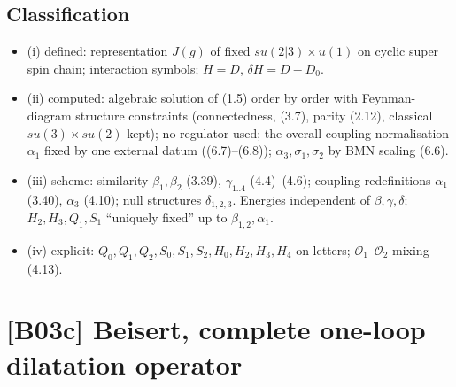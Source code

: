 \documentclass[10pt]{article}
\begin{document}
\subsection{Classification}
\begin{itemize}
\item (i) defined: representation $J(g)$ of fixed $su(2|3)\times u(1)$ on cyclic super spin chain; interaction symbols; $H=D$, $\delta H=D-D_0$.
\item (ii) computed: algebraic solution of (1.5) order by order with Feynman-diagram structure constraints (connectedness, (3.7), parity (2.12), classical $su(3)\times su(2)$ kept); no regulator used; the overall coupling normalisation $\alpha_1$ fixed by one external datum ((6.7)--(6.8)); $\alpha_3,\sigma_1,\sigma_2$ by BMN scaling (6.6).
\item (iii) scheme: similarity $\beta_1,\beta_2$ (3.39), $\gamma_{1..4}$ (4.4)--(4.6); coupling redefinitions $\alpha_1$ (3.40), $\alpha_3$ (4.10); null structures $\delta_{1,2,3}$. Energies independent of $\beta,\gamma,\delta$; $H_2,H_3,Q_1,S_1$ ``uniquely fixed'' up to $\beta_{1,2},\alpha_1$.
\item (iv) explicit: $Q_0,Q_1,Q_2,S_0,S_1,S_2,H_0,H_2,H_3,H_4$ on letters; $\mathcal O_1$--$\mathcal O_2$ mixing (4.13).
\end{itemize}

\section{[B03c] Beisert, complete one-loop dilatation operator}
\end{document}
